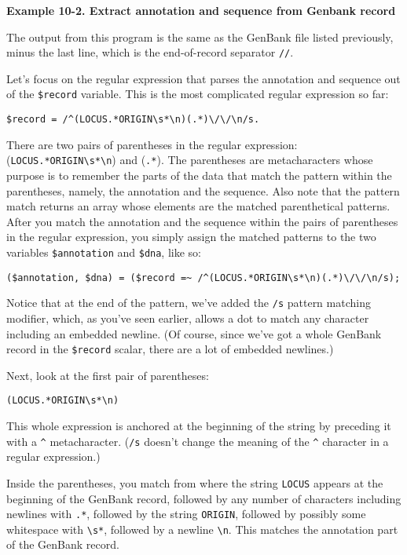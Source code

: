 \textbf{Example 10-2. Extract annotation and sequence from Genbank record}


The output from this program is the same as the GenBank file listed previously, minus the last line, which is the end-of-record separator \verb|//|.

Let's focus on the regular expression that parses the annotation and sequence out of the \verb|$record| variable. This is the most complicated regular expression so far: 

\begin{lstlisting}
$record = /^(LOCUS.*ORIGIN\s*\n)(.*)\/\/\n/s.
\end{lstlisting}

There are two pairs of parentheses in the regular expression: (\verb|LOCUS.*ORIGIN\s*\n|) and (\verb|.*|). The parentheses are metacharacters whose purpose is to remember the parts of the data that match the pattern within the parentheses, namely, the annotation and the sequence. Also note that the pattern match returns an array whose elements are the matched parenthetical patterns. After you match the annotation and the sequence within the pairs of parentheses in the regular expression, you simply assign the matched patterns to the two variables \verb|$annotation| and \verb|$dna|, like so: 

\begin{lstlisting}
($annotation, $dna) = ($record =~ /^(LOCUS.*ORIGIN\s*\n)(.*)\/\/\n/s);
\end{lstlisting}

Notice that at the end of the pattern, we've added the \verb|/s| pattern matching modifier, which, as you've seen earlier, allows a dot to match any character including an embedded newline. (Of course, since we've got a whole GenBank record in the \verb|$record| scalar, there are a lot of embedded newlines.)

Next, look at the first pair of parentheses:

\begin{lstlisting}
(LOCUS.*ORIGIN\s*\n)
\end{lstlisting}

This whole expression is anchored at the beginning of the string by preceding it with a \verb|^| metacharacter. (\verb|/s| doesn't change the meaning of the \verb|^| character in a regular expression.)

Inside the parentheses, you match from where the string \verb|LOCUS| appears at the beginning of the GenBank record, followed by any number of characters including newlines with \verb|.*|, followed by the string \verb|ORIGIN|, followed by possibly some whitespace with \verb|\s*|, followed by a newline \verb|\n|. This matches the annotation part of the GenBank record.

